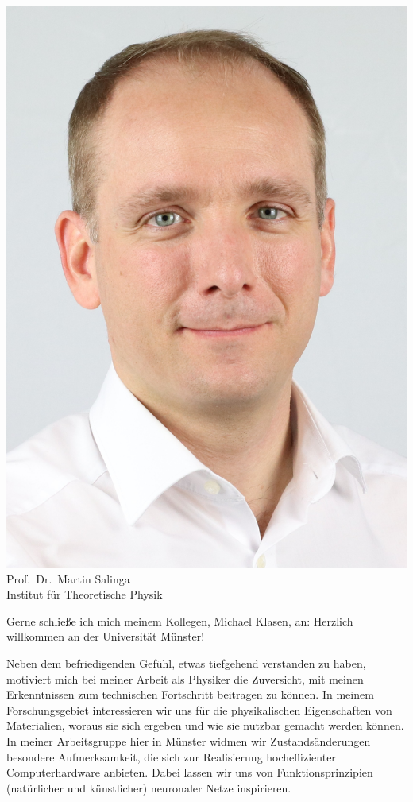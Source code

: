 \begin{multicols}{2}

\begin{center} 
\includegraphics[width=0.8\columnwidth, height=0.25\textheight]{res/vorstellungsfotos/Foto_Salinga.jpg}\\
\smallskip
Prof.\ Dr.\ Martin Salinga\\ 
Institut für Theoretische Physik
\end{center} 

Gerne schließe ich mich meinem Kollegen, Michael Klasen, an: Herzlich willkommen an der Universität Münster! 

Neben dem befriedigenden Gefühl, etwas tiefgehend verstanden zu haben, motiviert mich bei meiner Arbeit als Physiker die Zuversicht, mit meinen Erkenntnissen zum technischen Fortschritt beitragen zu können. In meinem Forschungsgebiet interessieren wir uns für die physikalischen Eigenschaften von Materialien, woraus sie sich ergeben und wie sie nutzbar gemacht werden können. In meiner Arbeitsgruppe hier in Münster widmen wir Zustandsänderungen besondere Aufmerksamkeit, die sich zur Realisierung hocheffizienter Computerhardware anbieten. Dabei lassen wir uns von Funktionsprinzipien (natürlicher und künstlicher) neuronaler Netze inspirieren. 


\end{multicols}
